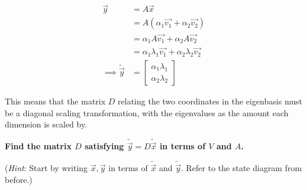 \begin{enumerate}[resume]
{  \begin{align*}
    \vec{y} &= A \vec{x} \\
    &= A(\alpha_1 \vec{v_1} + \alpha_2 \vec{v_2}) \\
    &= \alpha_1 A \vec{v_1} + \alpha_2 A \vec{v_2} \\
    &= \alpha_1 \lambda_1 \vec{v_1} + \alpha_2 \lambda_2 \vec{v_2} \\
    \implies \widetilde{\vec{y}} &= \begin{bmatrix} \alpha_1 \lambda_1 \\ \alpha_2 \lambda_2 \end{bmatrix}
  \end{align*}

  This means that the matrix $D$ relating the two coordinates in the eigenbasis must be a diagonal scaling transformation, with the eigenvalues as the amount each dimension is scaled by.
}

\qitem \textbf{Find the matrix $D$ satisfying $\widetilde{\vec{y}} = D \widetilde{\vec{x}}$ in terms of $V$ and $A$.}

(\textit{Hint}: Start by writing $\vec{x}, \vec{y}$ in terms of $\widetilde{\vec{x}}$ and $\widetilde{\vec{y}}$. Refer to the state diagram from before.)

\ws{\vspace{240px}}



\end{enumerate}
